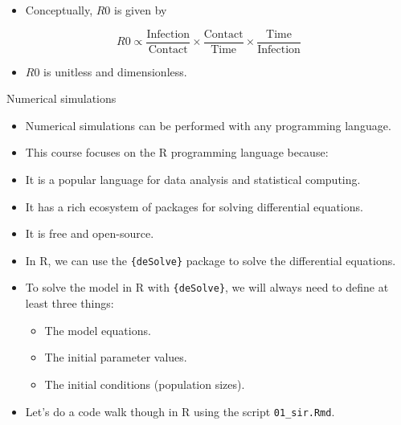 \documentclass[
  ignorenonframetext,
]{beamer}
\providecommand{\tightlist}{%
  \setlength{\itemsep}{0pt}\setlength{\parskip}{0pt}}\usepackage{longtable,booktabs,array}
\begin{document}
\begin{frame}
\begin{itemize}
\tightlist
\item
  Conceptually, \(R0\) is given by
\end{itemize}

\[
R0 \propto \dfrac{\text{Infection}}{\text{Contact}} \times \dfrac{\text{Contact}}{\text{Time}} \times \dfrac{\text{Time}}{\text{Infection}}
\]

\begin{itemize}
\tightlist
\item
  \(R0\) is unitless and dimensionless.
\end{itemize}
\end{frame}

\begin{frame}[fragile]
\begin{block}{Numerical simulations}
\label{numerical-simulations}
\begin{itemize}
\item
  Numerical simulations can be performed with any programming language.
\item
  This course focuses on the R programming language because:
\item
  It is a popular language for data analysis and statistical computing.
\item
  It has a rich ecosystem of packages for solving differential
  equations.
\item
  It is free and open-source.
\item
  In R, we can use the \texttt{\{deSolve\}} package to solve the
  differential equations.
\end{itemize}
\end{block}
\end{frame}

\begin{frame}[fragile]
\begin{itemize}
\tightlist
\item
  To solve the model in R with \texttt{\{deSolve\}}, we will always need
  to define at least three things:

  \begin{itemize}
  \tightlist
  \item
    The model equations.
  \item
    The initial parameter values.
  \item
    The initial conditions (population sizes).
  \end{itemize}
\item
  Let's do a code walk though in R using the script
  \texttt{01\_sir.Rmd}.
\end{itemize}
\end{frame}
\end{document}

